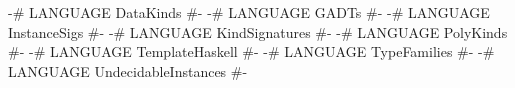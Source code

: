 \begin{code}
{-# LANGUAGE DataKinds            #-}
{-# LANGUAGE GADTs                #-}
{-# LANGUAGE InstanceSigs         #-}
{-# LANGUAGE KindSignatures       #-}
{-# LANGUAGE PolyKinds            #-}
{-# LANGUAGE TemplateHaskell      #-}
{-# LANGUAGE TypeFamilies         #-}
{-# LANGUAGE UndecidableInstances #-}
\end{code}
